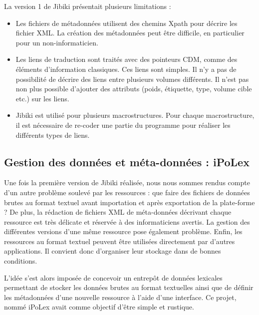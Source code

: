 \documentclass[10pt,a4paper,twoside]{article}
\begin{document}
La version 1 de Jibiki présentait plusieurs limitations :
\begin{itemize}
\item Les fichiers de métadonnées utilisent des chemins Xpath pour décrire les fichier XML. La création des métadonnées peut être difficile, en particulier pour un non-informaticien.
\item Les liens de traduction sont traités avec des pointeurs CDM, comme des éléments d'information classiques. Ces liens sont simples. Il n'y a pas de possibilité de décrire des liens entre plusieurs volumes différents. Il n'est pas non plus possible d'ajouter des attributs (poids, étiquette, type, volume cible etc.) sur les liens. 
\item Jibiki est utilisé pour plusieurs macrostructures. Pour chaque macrostructure, il est nécessaire de re-coder une partie du programme pour réaliser les différents types de liens.
\end{itemize}


\cite{MMAC06}

\subsection{Gestion des données et méta-données : iPoLex}


Une fois la première version de Jibiki réalisée, nous nous sommes rendus compte d'un autre problème soulevé par les ressources : que faire des fichiers de données brutes au format textuel avant importation et après exportation de la plate-forme ? 
De plus, la rédaction de fichiers XML de méta-données décrivant chaque ressource est très délicate et réservée à des informaticiens avertis.
La gestion des différentes versions d'une même ressource pose également problème.
Enfin, les ressources au format textuel peuvent être utilisées directement par d'autres applications. Il convient donc d'organiser leur stockage dans de bonnes conditions.

L'idée s'est alors imposée de concevoir un entrepôt de données lexicales permettant de stocker les données brutes au format textuelles ainsi que de définir les métadonnées d'une nouvelle ressource à l'aide d'une interface. Ce projet, nommé iPoLex avait comme objectif d'être simple et rustique.
\end{document}
